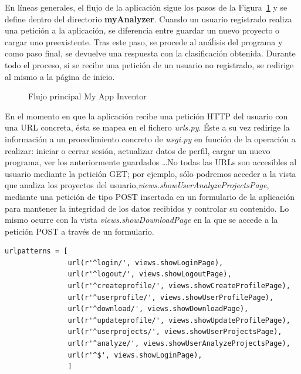 \documentclass[a4paper, 12pt]{book}
\begin{document}
En líneas generales, el flujo de la aplicación sigue los pasos de la Figura~\ref{fig:flujoapp} y se define dentro del directorio \textbf{myAnalyzer}. Cuando un usuario registrado realiza una petición a la aplicación, se diferencia entre guardar un nuevo proyecto o cargar uno preexistente. Tras este paso, se procede al anáĺisis del programa y como paso final, se devuelve una respuesta con la clasificación obtenida. Durante todo el proceso, si se recibe una petición de un usuario no registrado, se redirige al mismo a la página de inicio. 
\begin{figure}[H]
  \centering
  \caption{Flujo principal My App Inventor}
  \label{fig:flujoapp}
\end{figure}
En el momento en que la aplicación recibe una petición HTTP del usuario con una URL concreta, ésta se mapea en el fichero \textit{urls.py}. Éste a su vez redirige la información a un procedimiento concreto de \textit{wsgi.py} en función de la operación a realizar: iniciar o cerrar sesión, actualizar datos de perfil, cargar un nuevo programa, ver los anteriormente guardados \ldots No todas las URLs son accesibles al usuario mediante la petición GET; por ejemplo, sólo podremos acceder a la vista que analiza los proyectos del usuario,\textit{views.showUserAnalyzeProjectsPage}, mediante una petición de tipo POST insertada en un formulario de la aplicación para mantener la integridad de los datos recibidos y controlar su contenido. Lo mismo ocurre con la vista \textit{views.showDownloadPage} en la que se accede a la petición POST a través de un formulario.
\begin{verbatim}
urlpatterns = [
               url(r'^login/', views.showLoginPage),
               url(r'^logout/', views.showLogoutPage),
               url(r'^createprofile/', views.showCreateProfilePage),
               url(r'^userprofile/', views.showUserProfilePage),
               url(r'^download/', views.showDownloadPage),
               url(r'^updateprofile/', views.showUpdateProfilePage),
               url(r'^userprojects/', views.showUserProjectsPage),
               url(r'^analyze/', views.showUserAnalyzeProjectsPage),
               url(r'^$', views.showLoginPage),
               ]
\end{verbatim}
\end{document}

